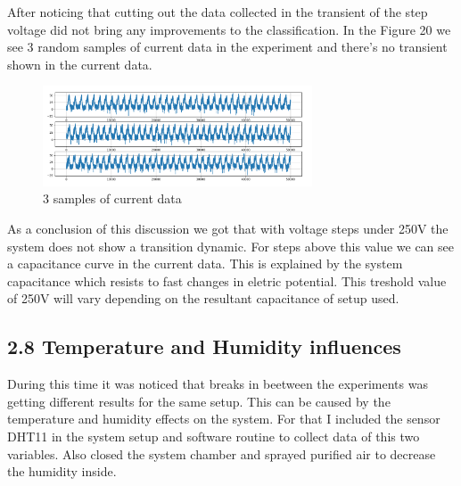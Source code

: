     After noticing that cutting out the data collected in the transient of the step voltage did not bring any improvements to the classification.
    In the Figure 20 we see 3 random samples of current data in the experiment and there's no transient shown in the current data.

    \begin{figure}[H]
        \center
        \includegraphics[width=8cm]{images/random_samples.png}
        \caption{ 3 samples of current data }
    \end{figure}

    As a conclusion of this discussion we got that with voltage steps under 250V the system does not show a transition dynamic. 
    For steps above this value we can see a capacitance curve in the current data. This is explained by the system capacitance which resists to fast changes in eletric potential.
    This treshold value of 250V will vary depending on the resultant capacitance of setup used.


\subsection*{2.8 Temperature and Humidity influences}

    During this time it was noticed that breaks in beetween the experiments was getting different results for the same setup. This can be caused by the temperature and humidity effects on the system.
    For that I included the sensor DHT11 in the system setup and software routine to collect data of this two variables. Also closed the system chamber and sprayed purified air to decrease the humidity inside.
    

